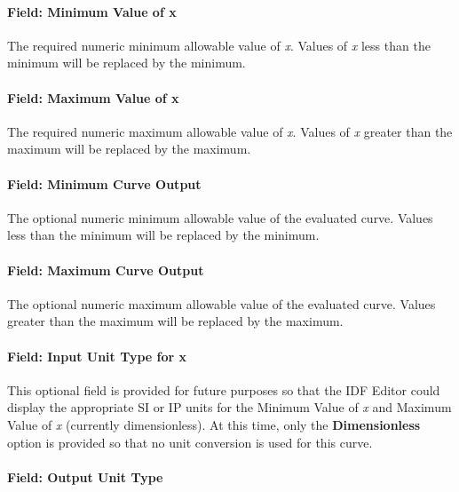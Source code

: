 \paragraph{Field: Minimum Value of x}\label{field-minimum-value-of-x-12}

The required numeric minimum allowable value of \emph{x}. Values of \emph{x} less than the minimum will be replaced by the minimum.

\paragraph{Field: Maximum Value of x}\label{field-maximum-value-of-x-13}

The required numeric maximum allowable value of \emph{x}. Values of \emph{x} greater than the maximum will be replaced by the maximum.

\paragraph{Field: Minimum Curve Output}\label{field-minimum-curve-output-12}

The optional numeric minimum allowable value of the evaluated curve. Values less than the minimum will be replaced by the minimum.

\paragraph{Field: Maximum Curve Output}\label{field-maximum-curve-output-11}

The optional numeric maximum allowable value of the evaluated curve. Values greater than the maximum will be replaced by the maximum.

\paragraph{Field: Input Unit Type for x}\label{field-input-unit-type-for-x-12}

This optional field is provided for future purposes so that the IDF Editor could display the appropriate SI or IP units for the Minimum Value of \emph{x} and Maximum Value of \emph{x} (currently dimensionless). At this time, only the \textbf{Dimensionless} option is provided so that no unit conversion is used for this curve.

\paragraph{Field: Output Unit Type}\label{field-output-unit-type-11}

